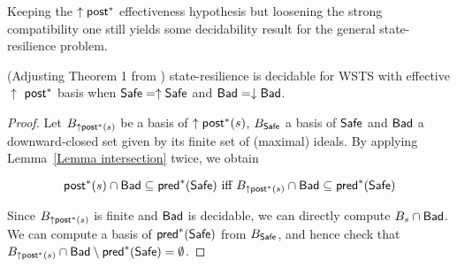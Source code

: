 

%
%
%











Keeping the $\uparrow \textsf{post}^*$ effectiveness hypothesis but loosening the strong compatibility one still yields some decidability result for the general state-resilience problem.


\begin{theorem}{(Adjusting Theorem 1 from \cite{DBLP:journals/corr/abs-2108-00889})}\label{post srp}
{\sc state-resilience} is decidable for 
 WSTS with effective 
$\uparrow$ $\textsf{post}^*$ basis
when
$\textsf{Safe}=\uparrow \textsf{Safe}$
and $\textsf{Bad}=\downarrow \textsf{Bad}$.
\end{theorem}


\begin{proof}
Let $B_{\uparrow \textsf{post}^*(s)}$ 
 be a basis of $\uparrow \textsf{post}^*(s)$, $B_{\textsf{Safe}}$ a basis of $\textsf{Safe}$
and $\textsf{Bad}$ a downward-closed set given by its finite set of (maximal) ideals.
By applying Lemma~\ref{Lemma intersection} twice, we obtain

$$ \textsf{post}^*(s) \cap \textsf{Bad} \subseteq \textsf{pred}^*(\textsf{Safe}) \text{ iff } B_{\uparrow \textsf{post}^*(s)} \cap \textsf{Bad} \subseteq \textsf{pred}^*(\textsf{Safe})$$

Since $B_{\uparrow \textsf{post}^*(s)}$ is finite and $\textsf{Bad}$ is decidable, we can directly compute $ B_s \cap \textsf{Bad}$.
We can compute a basis of $\textsf{pred}^*(\textsf{Safe})$ from $B_{\textsf{Safe}}$, and hence check that $B_{\uparrow \textsf{post}^*(s)} \cap \textsf{Bad} \setminus \textsf{pred}^*(\textsf{Safe}) = \emptyset$. 
\end{proof}

